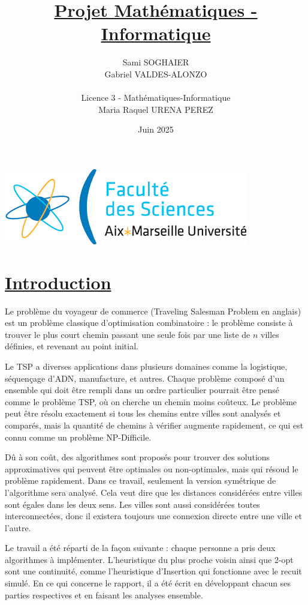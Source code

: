 \documentclass[a4paper,11pt,fleqn]{article}
\title{\underline{Projet Mathématiques - Informatique}}
\author{Sami SOGHAIER \\ Gabriel VALDES-ALONZO\\ \\ Licence 3 - Mathématiques-Informatique \\ Maria Raquel URENA PEREZ }
\date{Juin 2025}
\begin{document}
\maketitle
\begin{center}
    \includegraphics[scale=0.7]{index.png}
\end{center}

\newpage
{}

\section*{\underline{Introduction}}
Le problème du voyageur de commerce \cite{book:TSP,chap:TSP} (Traveling Salesman Problem en anglais) est un problème classique d’optimisation combinatoire : le problème consiste à trouver le plus court chemin passant une seule fois par une liste de $n$ villes définies, et revenant au point initial.
\newline

Le TSP a diverses applications dans plusieurs domaines comme la logistique, séquençage d'ADN, manufacture, et autres. Chaque problème composé d'un ensemble qui doit être rempli dans un ordre particulier pourrait être pensé comme le problème TSP, où on cherche un chemin moins coûteux. Le problème peut être résolu exactement si tous les chemins entre villes sont analysés et comparés, mais la quantité de chemins à vérifier augmente rapidement, ce qui est connu comme un problème NP-Difficile.
\newline

Dû à son coût, des algorithmes sont proposés pour trouver des solutions approximatives qui peuvent être optimales ou non-optimales, mais qui résoud le problème rapidement. Dans ce travail, seulement la version symétrique de l'algorithme sera analysé. Cela veut dire que les distances considérées entre villes sont égales dans les deux sens. Les villes sont aussi considérées toutes interconnectées, donc il existera toujours une connexion directe entre une ville et l'autre.
\newline

Le travail a été réparti de la façon suivante : chaque personne a pris deux algorithmes à implémenter. L'heuristique du plus proche voisin ainsi que 2-opt sont une continuité, comme l'heuristique d'Insertion qui fonctionne avec le recuit simulé. En ce qui concerne le rapport, il a été écrit en développant chacun ses parties respectives et en faisant les analyses ensemble.
\newline
\end{document}
